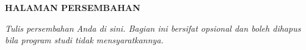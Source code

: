 {}
\begin{center}
    \textbf{\large HALAMAN PERSEMBAHAN}\\[3em]
\end{center}

\begin{center}
    \begin{minipage}{0.8\textwidth}
        \centering
        \textit{Tulis persembahan Anda di sini. Bagian ini bersifat opsional
        dan boleh dihapus bila program studi tidak mensyaratkannya.}
    \end{minipage}
\end{center}
\clearpage
